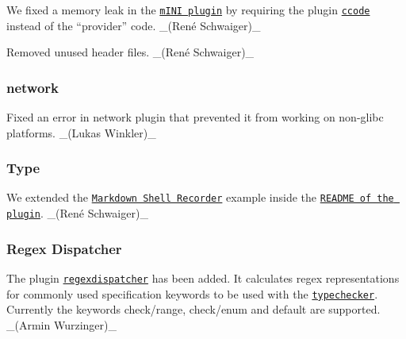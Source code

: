 \begin{DoxyItemize}
\item We fixed a memory leak in the \href{https://libelektra.org/plugins/mini}{\tt m\+I\+NI plugin} by requiring the plugin \href{https://libelektra.org/plugins/ccode}{\tt {\ttfamily ccode}} instead of the “provider” {\ttfamily code}. \+\_\+(René Schwaiger)\+\_\+
\item Removed unused header files. \+\_\+(René Schwaiger)\+\_\+
\end{DoxyItemize}

\subsubsection*{network}


\begin{DoxyItemize}
\item Fixed an error in network plugin that prevented it from working on non-\/glibc platforms. \+\_\+(\+Lukas Winkler)\+\_\+
\end{DoxyItemize}

\subsubsection*{Type}


\begin{DoxyItemize}
\item We extended the \href{https://master.libelektra.org/tests/shell/shell_recorder/tutorial_wrapper}{\tt Markdown Shell Recorder} example inside the \href{https://www.libelektra.org/plugins/type}{\tt R\+E\+A\+D\+ME of the plugin}. \+\_\+(René Schwaiger)\+\_\+
\end{DoxyItemize}

\subsubsection*{Regex Dispatcher}


\begin{DoxyItemize}
\item The plugin \href{https://www.libelektra.org/plugins/regexdispatcher}{\tt regexdispatcher} has been added. It calculates regex representations for commonly used specification keywords to be used with the \href{https://www.libelektra.org/plugins/typechecker}{\tt typechecker}. Currently the keywords {\ttfamily check/range}, {\ttfamily check/enum} and {\ttfamily default} are supported. \+\_\+(\+Armin Wurzinger)\+\_\+
\end{DoxyItemize}

